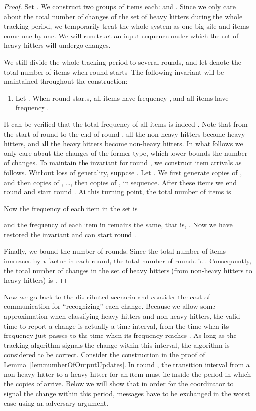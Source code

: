 \documentclass[10pt]{article}
\begin{document}
\begin{proof}
  Set . We construct two groups of 
  items each:  and
  . Since we only care
  about the total number of changes of the set of heavy hitters during the
  whole tracking period, we temporarily treat the whole system as one big
  site and items come one by one. We will construct an input sequence under
  which the set of heavy hitters will undergo  changes.

We still divide the whole tracking period to several rounds, and
let  denote the total number of items when round  starts.
The following invariant will be maintained throughout the
construction:
\begin{enumerate}
\item[] Let .  When round  starts, all items  have frequency , and all items  have frequency .
\end{enumerate}
It can be verified that the total frequency of all items is indeed
. Note that from the start of round  to the end of round
, all the non-heavy hitters become heavy hitters, and all the
heavy hitters become non-heavy hitters. In what follows we only
care about the changes of the former type, which lower bounds
the number of changes. To maintain the
invariant for round , we construct item arrivals as follows.
Without loss of generality, suppose . Let . We first generate
  copies of , and then 
copies of , \dots, then  copies of , in sequence.
After these items we end round  and start round
. At this turning point, the total number of items is

Now the frequency of each item in the set  is

and the frequency of each item in  remains the
same, that is, .  Now we have
  restored the invariant and can start round .

Finally, we bound the number of rounds.  Since the total number of
items  increases by a  factor in each
round, the total number of rounds is
. Consequently, the
total number of changes in the set of heavy hitters (from
non-heavy hitters to heavy hitters) is .
\end{proof}

Now we go back to the distributed scenario and consider the cost of
communication for ``recognizing'' each change. Because we allow some
approximation when classifying heavy hitters and non-heavy hitters, the
valid time to report a change is actually a time interval, from
the time when its frequency just passes  to the time when
its frequency reaches .  As long as the tracking algorithm signals
the change within this interval, the algorithm is considered to be correct.
Consider the construction in the proof of
Lemma~\ref{lem:numberOfOutputUpdates}.  In round , the transition
interval from a non-heavy hitter to a heavy hitter for an item  must lie
inside the period in which the  copies of  arrive.  Below we
will show that in order for the coordinator to signal the change within
this period,  messages have to be exchanged in the worst case
using an adversary argument.
\end{document}
